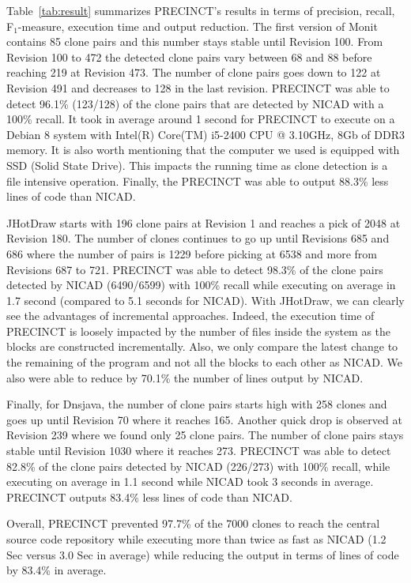 \documentclass[conference]{IEEEtran}
\begin{document}
Table~\ref{tab:result} summarizes PRECINCT's results in terms of precision, recall, F$_{1}$-measure, execution time and output reduction.
The first version of Monit contains 85 clone pairs and this number stays stable until Revision 100. From Revision 100 to 472 the detected clone pairs vary between 68 and 88 before reaching 219 at Revision 473.
The number of clone pairs goes down to 122 at Revision 491 and decreases to 128 in the last revision. PRECINCT was able to detect 96.1\% (123/128) of the clone pairs that are detected by NICAD with a 100\% recall.
It took in average around 1 second for PRECINCT to execute on a Debian 8 system with Intel(R) Core(TM) i5-2400 CPU @ 3.10GHz, 8Gb of DDR3 memory. 
It is also worth mentioning that the computer we used is equipped with SSD (Solid State Drive).
This impacts the running time as clone detection is a file intensive operation.
Finally, the PRECINCT was able to output 88.3\% less lines of code than NICAD.

JHotDraw starts with 196 clone pairs at Revision 1 and reaches a pick of 2048 at Revision 180. The number of clones  continues to go up until Revisions 685 and 686 where the number of pairs is 1229 before picking at 6538 and more from Revisions 687 to 721.
PRECINCT was able to detect 98.3\% of the clone pairs detected by NICAD (6490/6599) with 100\% recall while executing on average in 1.7 second (compared to 5.1 seconds for NICAD).
With JHotDraw, we can clearly see the advantages of incremental approaches.
Indeed, the execution time of PRECINCT is loosely impacted by the number of files inside the system as the blocks are constructed incrementally.
Also, we only compare the latest change to the remaining of the program and not all the blocks to each other as NICAD.
We also were able to reduce by 70.1\% the number of lines output by NICAD.

Finally, for Dnsjava, the number of clone pairs starts high with 258 clones and goes up until Revision 70 where it reaches 165. Another quick drop is observed at Revision 239 where we found only 25 clone pairs. The number of clone pairs stays stable until Revision 1030 where it reaches 273. PRECINCT was able to detect 82.8\% of the clone pairs detected by NICAD (226/273) with 100\% recall, while executing on average in 1.1 second while NICAD took 3 seconds in average. PRECINCT outputs  83.4\% less lines of code than NICAD.

Overall, PRECINCT prevented 97.7\% of the 7000 clones to reach the central source code repository while executing more than twice as fast as NICAD (1.2 Sec versus 3.0 Sec in average) while reducing the output in terms of lines of code by 83.4\% in average.
\end{document}

